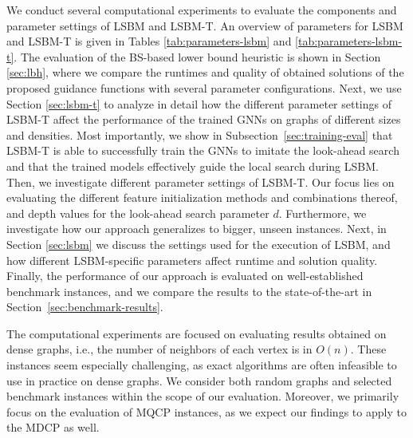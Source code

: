 \documentclass[draft,final]{vutinfth} %
\begin{document}
We conduct several computational experiments to evaluate the components and parameter settings of LSBM and LSBM-T. An overview of parameters for LSBM and LSBM-T is given in Tables \ref{tab:parameters-lsbm} and \ref{tab:parameters-lsbm-t}. 
The evaluation of the BS-based lower bound heuristic is shown in Section \ref{sec:lbh}, where we compare the runtimes and quality of obtained solutions of the proposed guidance functions with several parameter configurations. 
Next, we use Section \ref{sec:lsbm-t} to analyze in detail how the different parameter settings of LSBM-T affect the performance of the trained GNNs on graphs of different sizes and densities. Most importantly, we show in Subsection~\ref{sec:training-eval} that LSBM-T is able to successfully train the GNNs to imitate the look-ahead search and that the trained models effectively guide the local search during LSBM. Then, we investigate different parameter settings of LSBM-T. Our focus lies on evaluating the different feature initialization methods and combinations thereof, and depth values for the look-ahead search parameter $d$. Furthermore, we investigate how our approach generalizes to bigger, unseen instances. 
Next, in Section \ref{sec:lsbm} we discuss the settings used for the execution of LSBM, and how different LSBM-specific parameters affect runtime and solution quality. 
Finally, the performance of our approach is evaluated on well-established benchmark instances, and we compare the results to the state-of-the-art in Section~\ref{sec:benchmark-results}. 

The computational experiments are focused on evaluating results obtained on dense graphs, i.e., the number of neighbors of each vertex is in $O(n)$. 
These instances seem especially challenging, as exact algorithms are often infeasible to use in practice on dense graphs. We consider both random graphs and selected benchmark instances within the scope of our evaluation. Moreover, we primarily focus on the evaluation of MQCP instances, as we expect our findings to apply to the MDCP as well. 

\end{document}

